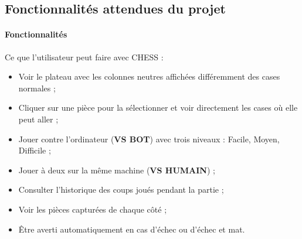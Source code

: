 \subsection{Fonctionnalités attendues du projet}
\label{sec:spec2}
\paragraph{Fonctionnalités} Ce que l'utilisateur peut faire avec CHESS :
\begin{itemize}
\item Voir le plateau avec les colonnes neutres affichées différemment des cases normales ;
\item Cliquer sur une pièce pour la sélectionner et voir directement les cases où elle peut aller ;
\item Jouer contre l'ordinateur (\textbf{VS BOT}) avec trois niveaux : Facile, Moyen, Difficile ;
\item Jouer à deux sur la même machine (\textbf{VS HUMAIN}) ;
\item Consulter l'historique des coups joués pendant la partie ;
\item Voir les pièces capturées de chaque côté ;
\item Être averti automatiquement en cas d'échec ou d'échec et mat.
\end{itemize}

